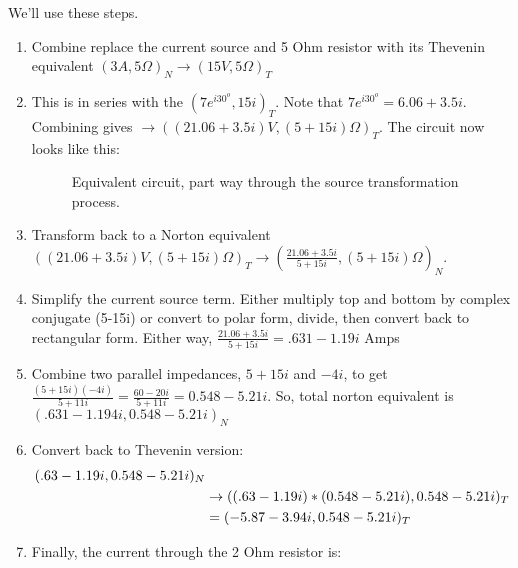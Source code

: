 We'll use these steps.
\begin{enumerate}
\item Combine replace the current source and 5 Ohm resistor with its Thevenin equivalent $(3A,5\Omega)_N \rightarrow (15V,5\Omega)_T$
\item This is in series with the $(7e^{i30^o},15i)_T$. Note that $7e^{i30^o}=6.06+3.5i$. Combining gives $\rightarrow ( (21.06+3.5i) V,(5+15i)\Omega)_T$. The circuit now looks like this:

\par
\begin{figure}[H]
\begin{center}
\caption{Equivalent circuit, part way through the source transformation process.} 
\end{center}
\end{figure}

\item Transform back to a Norton equivalent $( (21.06+3.5i) V,(5+15i)\Omega)_T \rightarrow (\frac{21.06+3.5i}{5+15i},(5+15i)\Omega)_N$.
 
\item Simplify the current source term. Either multiply top and bottom by complex conjugate (5-15i) or convert to polar form, divide, then convert back to rectangular form. Either way, $\frac{21.06+3.5i}{5+15i} = .631-1.19i$ Amps

\item Combine two parallel impedances, $5+15i$ and $-4i$, to get $\frac{(5+15i)(-4i)}{5+11i}=\frac{60-20i}{5+11i}=0.548-5.21i$. So, total norton equivalent is $( .631-1.194i,0.548-5.21i)_N$

\item Convert back to Thevenin version: 
\begin{align*}
( .63-1.19i,0.548-5.21i)_N& \notag \\
	&\rightarrow ( (.63-1.19i)*(0.548-5.21i),0.548-5.21i)_T \notag \\
	&= (-5.87-3.94i ,0.548-5.21i)_T
\end{align*}
\item Finally, the current through the 2 Ohm resistor is:


\end{enumerate}
